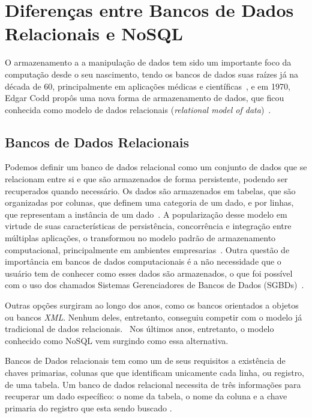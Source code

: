 \chapter{Diferenças entre Bancos de Dados Relacionais e NoSQL}

O armazenamento a a manipulação de dados tem sido um importante foco da computação desde o seu nascimento, tendo os bancos de dados suas raízes já na década de 60, principalmente em aplicações médicas e científicas~\cite{neufeld1986database}, e em 1970, Edgar Codd propôs uma nova forma de armazenamento de dados, que ficou conhecida como modelo de dados relacionais (\emph{relational model of data})~\cite{codd1970relational}. 

\section{Bancos de Dados Relacionais}
    Podemos definir um banco de dados relacional como um conjunto de dados que se relacionam entre si e que são armazenados de forma persistente, podendo ser recuperados quando necessário. Os dados são armazenados em tabelas, que são organizadas por colunas, que definem uma categoria de um dado, e por linhas, que representam a instância de um dado~\cite{leavitt2010nosql}. A popularização desse modelo em virtude de suas características de persistência, concorrência e integração entre múltiplas aplicações, o transformou no modelo padrão de armazenamento computacional, principalmente em ambientes empresarias~\cite{pramod}. Outra questão de importância em bancos de dados computacionais é a não necessidade que o usuário tem de conhecer como esses dados são armazenados, o que foi possível com o uso dos chamados Sistemas Gerenciadores de Bancos de Dados (SGBDs)~\cite{jan}.
    
    Outras opções surgiram ao longo dos anos, como os bancos orientados a objetos ou bancos \emph{XML}. Nenhum deles, entretanto, conseguiu competir com o modelo já tradicional de dados relacionais.~\cite{pramod} Nos últimos anos, entretanto, o modelo conhecido como NoSQL vem surgindo como essa alternativa.
    
    Bancos de Dados relacionais tem como um de seus requisitos a existência de chaves primarias, colunas que que identificam unicamente cada linha, ou registro, de uma tabela. Um banco de dados relacional necessita de três informações para recuperar um dado específico: o nome da tabela, o nome da coluna e a chave primaria do registro que esta sendo buscado \cite{jan}.

